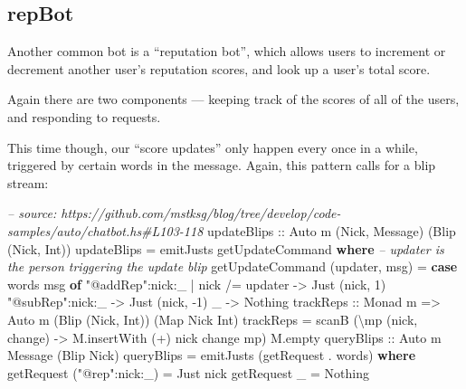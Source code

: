 \documentclass[]{article}
\newenvironment{Shaded}{}{}
\newcommand{\KeywordTok}[1]{\textcolor[rgb]{0.00,0.44,0.13}{\textbf{{#1}}}}
\newcommand{\DataTypeTok}[1]{\textcolor[rgb]{0.56,0.13,0.00}{{#1}}}
\newcommand{\DecValTok}[1]{\textcolor[rgb]{0.25,0.63,0.44}{{#1}}}
\newcommand{\StringTok}[1]{\textcolor[rgb]{0.25,0.44,0.63}{{#1}}}
\newcommand{\CommentTok}[1]{\textcolor[rgb]{0.38,0.63,0.69}{\textit{{#1}}}}
\newcommand{\OtherTok}[1]{\textcolor[rgb]{0.00,0.44,0.13}{{#1}}}
\newcommand{\FunctionTok}[1]{\textcolor[rgb]{0.02,0.16,0.49}{{#1}}}
\newcommand{\NormalTok}[1]{{#1}}
\begin{document}
\subsection{repBot}\label{repbot}

Another common bot is a ``reputation bot'', which allows users to increment or
decrement another user's reputation scores, and look up a user's total score.

Again there are two components --- keeping track of the scores of all of the
users, and responding to requests.

This time though, our ``score updates'' only happen every once in a while,
triggered by certain words in the message. Again, this pattern calls for a blip
stream:

\begin{Shaded}
\begin{Highlighting}[]
\CommentTok{-- source: https://github.com/mstksg/blog/tree/develop/code-samples/auto/chatbot.hs#L103-118}
\OtherTok{    updateBlips ::} \DataTypeTok{Auto} \NormalTok{m (}\DataTypeTok{Nick}\NormalTok{, }\DataTypeTok{Message}\NormalTok{) (}\DataTypeTok{Blip} \NormalTok{(}\DataTypeTok{Nick}\NormalTok{, }\DataTypeTok{Int}\NormalTok{))}
    \NormalTok{updateBlips }\FunctionTok{=} \NormalTok{emitJusts getUpdateCommand}
      \KeywordTok{where}
        \CommentTok{-- updater is the person triggering the update blip}
        \NormalTok{getUpdateCommand (updater, msg) }\FunctionTok{=}
          \KeywordTok{case} \NormalTok{words msg }\KeywordTok{of}
            \StringTok{"@addRep"}\FunctionTok{:}\NormalTok{nick}\FunctionTok{:}\NormalTok{_ }\FunctionTok{|} \NormalTok{nick }\FunctionTok{/=} \NormalTok{updater }\OtherTok{->} \DataTypeTok{Just} \NormalTok{(nick, }\DecValTok{1}\NormalTok{)}
            \StringTok{"@subRep"}\FunctionTok{:}\NormalTok{nick}\FunctionTok{:}\NormalTok{_                   }\OtherTok{->} \DataTypeTok{Just} \NormalTok{(nick, }\FunctionTok{-}\DecValTok{1}\NormalTok{)}
            \NormalTok{_                                  }\OtherTok{->} \DataTypeTok{Nothing}
\OtherTok{    trackReps ::} \DataTypeTok{Monad} \NormalTok{m }\OtherTok{=>} \DataTypeTok{Auto} \NormalTok{m (}\DataTypeTok{Blip} \NormalTok{(}\DataTypeTok{Nick}\NormalTok{, }\DataTypeTok{Int}\NormalTok{)) (}\DataTypeTok{Map} \DataTypeTok{Nick} \DataTypeTok{Int}\NormalTok{)}
    \NormalTok{trackReps }\FunctionTok{=} \NormalTok{scanB (\textbackslash{}mp (nick, change) }\OtherTok{->} \NormalTok{M.insertWith (}\FunctionTok{+}\NormalTok{) nick change mp) M.empty}
\OtherTok{    queryBlips ::} \DataTypeTok{Auto} \NormalTok{m }\DataTypeTok{Message} \NormalTok{(}\DataTypeTok{Blip} \DataTypeTok{Nick}\NormalTok{)}
    \NormalTok{queryBlips }\FunctionTok{=} \NormalTok{emitJusts (getRequest }\FunctionTok{.} \NormalTok{words)}
      \KeywordTok{where}
        \NormalTok{getRequest (}\StringTok{"@rep"}\FunctionTok{:}\NormalTok{nick}\FunctionTok{:}\NormalTok{_) }\FunctionTok{=} \DataTypeTok{Just} \NormalTok{nick}
        \NormalTok{getRequest _                }\FunctionTok{=} \DataTypeTok{Nothing}




\end{Highlighting}
\end{Shaded}
\end{document}
